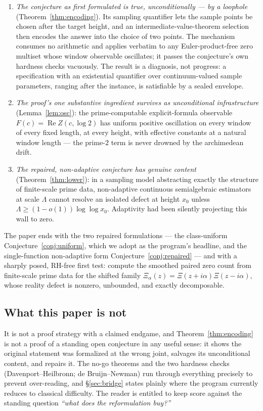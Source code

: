\documentclass[11pt]{amsart}
\theoremstyle{plain}
\theoremstyle{definition}
\theoremstyle{remark}
\newcommand{\re}{\operatorname{Re}}
\begin{document}
\begin{enumerate}
\item \emph{The conjecture as first formulated is true, unconditionally --- by a loophole}
(Theorem~\ref{thm:encoding}). Its sampling quantifier lets the sample points be chosen after the
target height, and an intermediate-value-theorem selection then encodes the answer into the choice
of two points. The mechanism consumes no arithmetic and applies verbatim to any Euler-product-free
zero multiset whose window observable oscillates; it passes the conjecture's own hardness checks
vacuously. The result is a diagnosis, not
progress: a specification with an existential quantifier over continuum-valued sample parameters,
ranging after the instance, is satisfiable by a sealed envelope.
\item \emph{The proof's one substantive ingredient survives as unconditional infrastructure}
(Lemma~\ref{lem:osc}): the prime-computable explicit-formula observable $F(c)=\re Z(c,\log2)$ has
uniform positive oscillation on every window of every fixed length, at every height, with
effective constants at a natural window length --- the prime-$2$ term is never drowned by the
archimedean drift.
\item \emph{The repaired, non-adaptive conjecture has genuine content}
(Theorem~\ref{thm:lower}): in a sampling model abstracting exactly the structure of finite-scale
prime data, non-adaptive continuous semialgebraic estimators at scale $\Lambda$ cannot resolve an
isolated defect at height $x_0$ unless $\Lambda\ge(1-o(1))\log\log x_0$. Adaptivity had been
silently projecting this wall to zero.
\end{enumerate}

The paper ends with the two repaired formulations --- the class-uniform
Conjecture~\ref{conj:uniform}, which we adopt as the program's headline, and the single-function
non-adaptive form Conjecture~\ref{conj:repaired} --- and with a sharply posed, RH-free first test: compute
the smoothed paired zero count from finite-scale prime data for the shifted family
$\Xi_\alpha(z)=\Xi(z+i\alpha)\Xi(z-i\alpha)$, whose reality defect is nonzero, unbounded, and
exactly decomposable.

\subsection*{What this paper is not}
It is not a proof strategy with a claimed endgame, and Theorem~\ref{thm:encoding} is not a proof of
a standing open conjecture in any useful sense: it shows the original statement was formalized at
the wrong joint, salvages its unconditional content, and repairs it. The no-go theorems and the two
hardness checks (Davenport--Heilbronn; de Bruijn--Newman) run through everything precisely to
prevent over-reading, and \S\ref{sec:bridge} states plainly where the program currently reduces to
classical difficulty. The reader is entitled to keep score against the standing question
\emph{``what does the reformulation buy?''}
\end{document}
